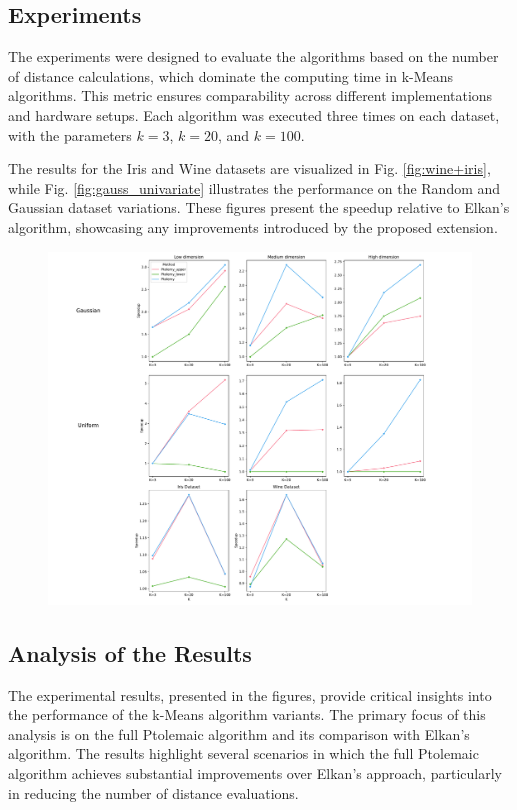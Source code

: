 \subsection{Experiments}

The experiments were designed to evaluate the algorithms based on the number of distance calculations, which dominate the computing time in k-Means algorithms. This metric ensures comparability across different implementations and hardware setups. Each algorithm was executed three times on each dataset, with the parameters $k = 3$, $k = 20$, and $k = 100$.

The results for the Iris and Wine datasets are visualized in Fig. \ref{fig:wine+iris}, while Fig. \ref{fig:gauss_univariate} illustrates the performance on the Random and Gaussian dataset variations. These figures present the speedup relative to Elkan's algorithm, showcasing any improvements introduced by the proposed extension.


\begin{figure}
  \centering
  \includegraphics[width=\textwidth]{fig/combined_plot.pdf}
  \caption{}
  \label{fig:combined}
\end{figure}


\subsection{Analysis of the Results}

The experimental results, presented in the figures, provide critical insights into the performance of the k-Means algorithm variants. The primary focus of this analysis is on the full Ptolemaic algorithm and its comparison with Elkan’s algorithm. The results highlight several scenarios in which the full Ptolemaic algorithm achieves substantial improvements over Elkan’s approach, particularly in reducing the number of distance evaluations.

